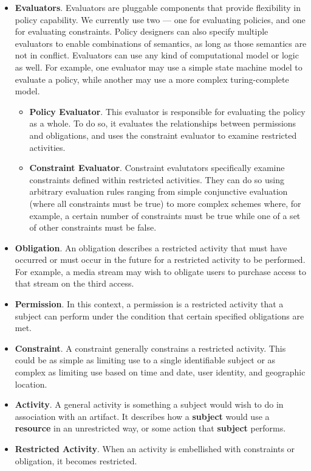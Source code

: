 \begin{itemize}
\item \textbf{Evaluators}.  Evaluators are pluggable components that provide flexibility in policy capability.  We currently use two --- one for evaluating policies, and one for evaluating constraints.  Policy designers can also specify multiple evaluators to enable combinations of semantics, as long as those semantics are not in conflict.  Evaluators can use any kind of computational model or logic as well.  For example, one evaluator may use a simple state machine model to evaluate a policy, while another may use a more complex turing-complete model.
\begin{itemize}
\item \textbf{Policy Evaluator}.  This evaluator is responsible for evaluating the policy as a whole.  To do so, it evaluates the relationships between permissions and obligations, and uses the constraint evaluator to examine restricted activities.
\item \textbf{Constraint Evaluator}.  Constraint evalutators specifically examine constraints defined within restricted activities.  They can do so using arbitrary evaluation rules ranging from simple conjunctive evaluation (where all constraints must be true) to more complex schemes where, for example, a certain number of constraints must be true while one of a set of other constraints must be false.
\end{itemize}
\item \textbf{Obligation}.  An obligation describes a restricted activity that must have occurred or must occur in the future for a restricted activity to be performed.  For example, a media stream may wish to obligate users to purchase access to that stream on the third access.
\item \textbf{Permission}.  In this context, a permission is a restricted activity that a subject can perform under the condition that certain specified obligations are met.
\item \textbf{Constraint}.  A constraint generally constrains a restricted activity.  This could be as simple as limiting use to a single identifiable subject or as complex as limiting use based on time and date, user identity, and geographic location.
\item \textbf{Activity}.  A general activity is something a subject would wish to do in association with an artifact.  It describes how a \textbf{subject} would use a \textbf{resource} in an unrestricted way, or some action that \textbf{subject} performs.
\item \textbf{Restricted Activity}.  When an activity is embellished with constraints or obligation, it becomes restricted.
\end{itemize}


